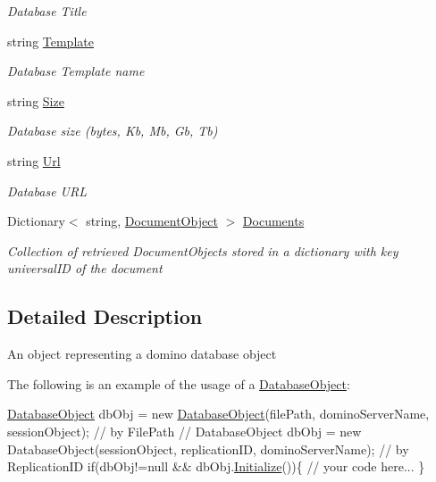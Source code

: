 \begin{DoxyCompactItemize}
\begin{DoxyCompactList}\small\item\em Database Title \end{DoxyCompactList}\item 
string \hyperlink{class_database_object_ac8ecdbe9722c00f787a62aef7d3dfa5a}{Template}
\begin{DoxyCompactList}\small\item\em Database Template name \end{DoxyCompactList}\item 
string \hyperlink{class_database_object_ad86f5dd95a9debdef284e21e32936e9e}{Size}
\begin{DoxyCompactList}\small\item\em Database size (bytes, Kb, Mb, Gb, Tb) \end{DoxyCompactList}\item 
string \hyperlink{class_database_object_a12da011e3dc03d3a10ac86df10c84f48}{Url}
\begin{DoxyCompactList}\small\item\em Database U\+RL \end{DoxyCompactList}\item 
Dictionary$<$ string, \hyperlink{class_document_object}{Document\+Object} $>$ \hyperlink{class_database_object_afaf1159aa427c5bcce01c4b8c6f34514}{Documents}
\begin{DoxyCompactList}\small\item\em Collection of retrieved Document\+Objects stored in a dictionary with key universal\+ID of the document \end{DoxyCompactList}\end{DoxyCompactItemize}


\subsection{Detailed Description}
An object representing a domino database object 

The following is an example of the usage of a {\ttfamily \hyperlink{class_database_object}{Database\+Object}}\+: 
\begin{DoxyCode}
\hyperlink{class_database_object}{DatabaseObject} dbObj = \textcolor{keyword}{new} \hyperlink{class_database_object_ab16b4327b02ffedcd1b003cea9d949a1}{DatabaseObject}(filePath, dominoServerName,  
      sessionObject); \textcolor{comment}{// by FilePath}
\textcolor{comment}{//  DatabaseObject dbObj = new DatabaseObject(sessionObject, replicationID, dominoServerName); // by
       ReplicationID}
\textcolor{keywordflow}{if}(dbObj!=null && dbObj.\hyperlink{class_database_object_a7de43a21bd287deec537cffec343f41d}{Initialize}())\{
     \textcolor{comment}{// your code here... }
\}
\end{DoxyCode}
 

